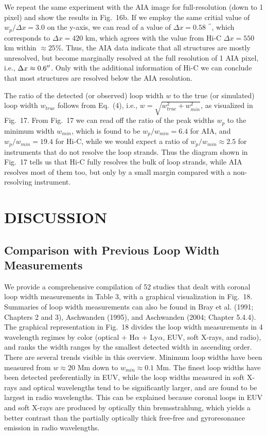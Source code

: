 \documentclass[10pt,preprint]{aastex}  %
\def\arcsec{\hbox{$^{\prime\prime}$}}
\begin{document}
We repeat the same experiment with the AIA image 
for full-resolution (down to 1 pixel) and
show the results in Fig.~16b. If we employ the same
critial value of $w_p/\Delta x=3.0$ on the y-axis, 
we can read of a value of $\Delta x = 0.58$ \arcsec,
which corresponds to $\Delta x = 420$ km, which 
agrees with the value from Hi-C $\Delta x = 550$ km
within $\approx 25\%$.
Thus, the AIA data indicate that all structures are
mostly unresolved, but become marginally resolved
at the full resolution of 1 AIA pixel,
i.e., $\Delta x \approx 0.6\arcsec$. 
Only with the additional information of Hi-C we can
conclude that most structures are resolved below the
AIA resolution.

The ratio of the detected (or observed) loop width $w$ to the true 
(or simulated) loop width $w_{true}$ follows from Eq.~(4), 
i.e., $w = \sqrt{w_{true}^2 + w_{min}^2}$,
as visualized in Fig.~17. From Fig.~17 we can read off
the ratio of the peak widths $w_p$ to the minimum width $w_{min}$,
which is found to be $w_p/w_{min}=6.4$ for AIA, and 
$w_p/w_{min}=19.4$ for Hi-C, while we would expect a ratio of
$w_p/w_{min} \approx 2.5$ for instruments that do not resolve
the loop strands. Thus the diagram shown in Fig.~17 
tells us that Hi-C fully resolves the bulk of loop strands,
while AIA resolves most of them too, but only by a small margin
compared with a non-resolving instrument.

\section{	DISCUSSION				}

\subsection{	Comparison with Previous Loop Width Measurements 	}

We provide a comprehensive compilation of 52 studies 
that dealt with coronal
loop width measurements in Table 3, with a graphical visualization 
in Fig.~18. Summaries of loop width measurements can also be
found in Bray et al. (1991; Chapters 2 and 3), Aschwanden (1995),
and Aschwanden (2004; Chapter 5.4.4). The graphical representation
in Fig.~18 divides the loop width measurements in 4 wavelength
regimes by color (optical + H$\alpha$ + Ly$\alpha$, EUV, 
soft X-rays, and radio), and ranks the width ranges by the
smallest detected width in ascending order. There are several
trends visible in this overview. Minimum loop widths have been
measured from $w \approx 20$ Mm down to $w_{min} \approx 0.1$ Mm.
The finest loop widths have been detected preferentially 
in EUV, while the
loop widths measured in soft X-rays and optical wavelengths
tend to be significantly larger, and are found to be largest in
radio wavelengths. This can be explained because coronal loops 
in EUV and soft X-rays are produced by optically thin 
bremsstrahlung, which yields a better contrast than the partially 
optically thick free-free and gyroresonance emission in radio 
wavelengths.
\end{document}
